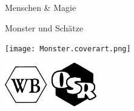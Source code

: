 \vspace{10mm}

\begin{center}
\fontsize{40}{48}\selectfont Menschen \& Magie

\large{Monster und Schätze}

\vspace{15mm}

\texttt{[image: Monster.coverart.png]}

\vspace{20mm}

\includegraphics[height=1.9cm]{../img/logo.png}
\end{center}

